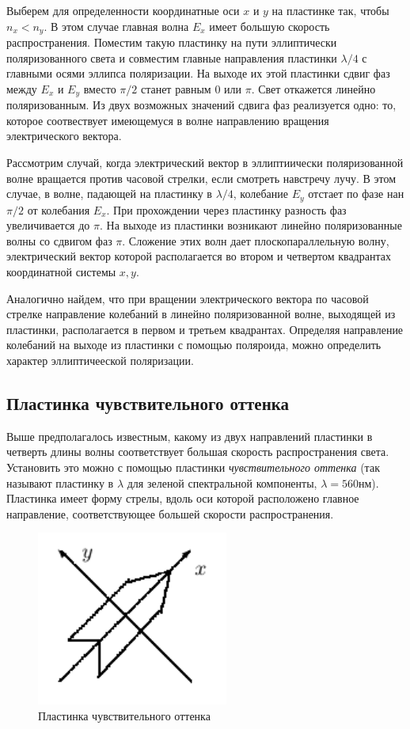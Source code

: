 \documentclass[a4paper,12pt]{article}
\begin{document}
Выберем для определенности координатные оси $x$ и $y$ на пластинке так, чтобы $n_x<n_y$. В этом случае главная волна $E_x$ имеет большую скорость распространения. Поместим такую пластинку на пути эллиптически поляризованного света и совместим главные направления пластинки $\lambda/4$ с главными осями эллипса поляризации. На выходе их этой пластинки сдвиг фаз между $E_x$ и $E_y$ вместо $\pi/2$ станет равным 0 или $\pi$. Свет откажется линейно поляризованным. Из двух возможных значений сдвига фаз реализуется одно: то, которое соотвествует имеющемуся в волне направлению вращения электрического вектора.

Рассмотрим случай, когда электрический вектор в эллиптиически поляризованной волне вращается против часовой стрелки, если смотреть навстречу лучу. В этом случае, в волне, падающей на пластинку в $\lambda/4$, колебание $E_y$ отстает по фазе нан $\pi/2$ от колебания $E_x$. При прохождении через пластинку разность фаз увеличивается до $\pi$. На выходе из пластинки возникают линейно поляризованные волны со сдвигом фаз $\pi$. Сложение этих волн дает плоскопараллельную волну, электрический вектор которой располагается во втором и четвертом квадрантах координатной системы $x,y$.

Аналогично найдем, что при вращении электрического вектора по часовой стрелке направление колебаний в линейно поляризованной волне, выходящей из пластинки, располагается в первом и третьем квадрантах. Определяя направление колебаний на выходе из пластинки с помощью поляроида, можно определить характер эллиптичееской поляризации.

\subsection{Пластинка чувствительного оттенка}

Выше предполагалось известным, какому из двух направлений пластинки в четверть длины волны соответствует большая скорость распространения света. Установить это можно с помощью пластинки \textit{чувствительного оттенка} (так называют пластинку в $\lambda$ для зеленой спектральной компоненты, $\lambda=560$нм). Пластинка имеет форму стрелы, вдоль оси которой расположено главное направление, соответствующее большей скорости распространения.

\begin{figure}[h]
\centering
\includegraphics[width=0.2\linewidth]{img3.png}
\caption{Пластинка чувствительного оттенка}
\label{img3}
\end{figure}
\end{document}
